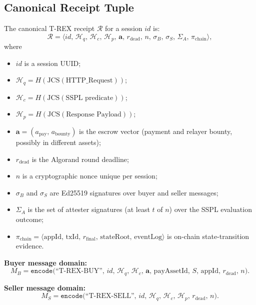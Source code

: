 \documentclass[journal]{IEEEtran}
\newcommand{\set}[1]{\mathcal{#1}}
\begin{document}
\subsection{Canonical Receipt Tuple}
The canonical T-REX receipt $\set{R}$ for a session $id$ is:
\begin{equation}
\set{R} = \langle
id,\, \set{H}_q,\, \set{H}_c,\, \set{H}_p,\, \mathbf{a},\,
r_{\text{dead}},\, n,\,
\sigma_B,\, \sigma_S,\, \Sigma_A,\, \pi_{\text{chain}}
\rangle,
\label{eq:receipt}
\end{equation}
where
\begin{itemize}[leftmargin=*]
\item $id$ is a session UUID;
\item $\set{H}_q = H(\text{JCS}(\text{HTTP\_Request}))$;
\item $\set{H}_c = H(\text{JCS}(\text{SSPL predicate}))$;
\item $\set{H}_p = H(\text{JCS}(\text{Response Payload}))$;
\item $\mathbf{a} = (a_{\text{pay}},\, a_{\text{bounty}})$ is the
escrow vector (payment and relayer bounty, possibly in different
assets);
\item $r_{\text{dead}}$ is the Algorand round deadline;
\item $n$ is a cryptographic nonce unique per session;
\item $\sigma_B$ and $\sigma_S$ are Ed25519 signatures over buyer
and seller messages;
\item $\Sigma_A$ is the set of attester signatures (at least $t$
of $n$) over the SSPL evaluation outcome;
\item $\pi_{\text{chain}} = \langle \text{appId},\, \text{txId},\,
r_{\text{final}},\, \text{stateRoot},\, \text{eventLog} \rangle$
is on-chain state-transition evidence.
\end{itemize}

\noindent\textbf{Buyer message domain:}
\begin{equation}
M_B = \texttt{encode}\bigl(\text{``T-REX-BUY''},\, id,\, \set{H}_q,\,
\set{H}_c,\, \mathbf{a},\, \text{payAssetId},\, S,\, \text{appId},\,
r_{\text{dead}},\, n\bigr).
\end{equation}

\noindent\textbf{Seller message domain:}
\begin{equation}
M_S = \texttt{encode}\bigl(\text{``T-REX-SELL''},\, id,\, \set{H}_q,\,
\set{H}_c,\, \set{H}_p,\, r_{\text{dead}},\, n\bigr).
\end{equation}
\end{document}
